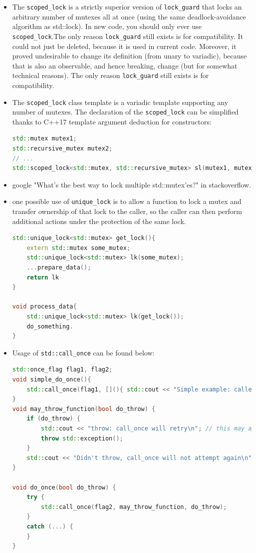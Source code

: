 \documentclass[a4paper,11pt,twoside]{book}
\begin{document}
\begin{itemize}
    \item The \texttt{scoped\_lock} is a strictly superior version of \texttt{lock\_guard} that locks an arbitrary number of mutexes all at once (using the same deadlock-avoidance algorithm as std::lock). In new code, you should only ever use \texttt{scoped\_lock}.The only reason \texttt{lock\_guard} still exists is for compatibility. It could not just be deleted, because it is used in current code. Moreover, it proved undesirable to change its definition (from unary to variadic), because that is also an observable, and hence breaking, change (but for somewhat technical reasons). The only reason \texttt{lock\_guard} still exists is for compatibility. 

	
	\item The \texttt{scoped\_lock} class template is a variadic template supporting any number of mutexes. The declaration of the \texttt{scoped\_lock} can be simplified thanks to C++17 template argument deduction for constructors:
\begin{lstlisting}[frame=single, language=c++]	
std::mutex mutex1;
std::recursive_mutex mutex2;
// ...
std::scoped_lock<std::mutex, std::recursive_mutex> sl(mutex1, mutex2);
\end{lstlisting}	
	

    \item google "What's the best way to lock multiple std::mutex'es?" in stackoverflow. 

    \item one possible use of \texttt{unique\_lock} is to allow a function to lock a mutex and transfer ownership of that lock to the caller, so the caller can then perform additional actions under the protection of the same lock. 

\begin{lstlisting}[frame=single, language=c++]	
std::unique_lock<std::mutex> get_lock(){
	extern std::mutex some_mutex;
	std::unique_lock<std::mutex> lk(some_mutex);
	...prepare_data();
	return lk
}

void process_data{
	std::unique_lock<std::mutex> lk(get_lock());
	do_something.
}
\end{lstlisting}

    \item Usage of \texttt{std::call\_once} can be found below:

\begin{lstlisting}[frame=single, language=c++]	
std::once_flag flag1, flag2;
void simple_do_once(){
	std::call_once(flag1, [](){ std::cout << "Simple example: called once\n"; });
}
void may_throw_function(bool do_throw) {
	if (do_throw) {
		std::cout << "throw: call_once will retry\n"; // this may appear more than once
		throw std::exception();
	}
	std::cout << "Didn't throw, call_once will not attempt again\n"; // guaranteed once
}

void do_once(bool do_throw) {
	try {
		std::call_once(flag2, may_throw_function, do_throw);
	}
	catch (...) {
	}
}	
\end{lstlisting}
\end{itemize}
\end{document}
